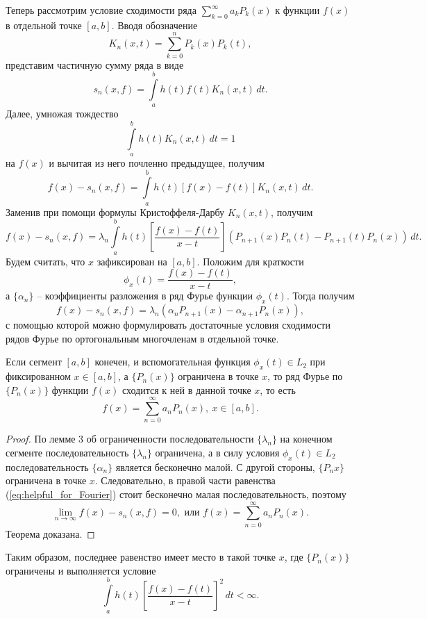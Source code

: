 Теперь рассмотрим условие сходимости ряда \( \sum\limits_{k=0}^\infty a_kP_k(x)
\) к функции \( f(x) \)  в отдельной точке \( [a,b] \). Вводя обозначение
\[
    K_n(x,t) = \sum\limits_{k=0}^n P_k(x)P_k(t),
\]
представим частичную сумму ряда в виде
\[
    s_n(x,f) = \int\limits_a^b h(t)f(t)K_n(x,t)\,dt.
\]
Далее, умножая тождество
\[
    \int\limits_a^b h(t)K_n(x,t)\,dt = 1
\]
на \( f(x) \) и вычитая из него почленно предыдущее, получим
\[
    f(x) - s_n(x,f) = \int\limits_a^b h(t)[f(x)-f(t)]K_n(x,t)\,dt.
\]
Заменив при помощи формулы Кристоффеля-Дарбу \( K_n(x,t) \), получим
\[
    f(x) - s_n(x,f) = \lambda_n\int\limits_a^b h(t)
    \left[\frac{f(x)-f(t)}{x-t}\right](P_{n+1}(x)P_n(t)-P_{n+1}(t)P_n(x))\,dt.
\]
Будем считать, что \( x \) зафиксирован на \( [a,b] \). Положим для краткости
\[
    \phi_x(t) = \frac{f(x)-f(t)}{x-t},
\]
а \( \{ \alpha_n \} \) -- коэффициенты разложения в ряд Фурье функции
\( \phi_x(t) \). Тогда получим 
\begin{equation}
    f(x) - s_n(x,f) = \lambda_n(\alpha_nP_{n+1}(x) - \alpha_{n+1}P_n(x)),
    \label{eq:helpful_for_Fourier}
\end{equation}
с помощью которой можно формулировать достаточные условия сходимости рядов Фурье
по ортогональным многочленам в отдельной точке.
\begin{theorem}
    Если сегмент \( [a,b] \) конечен, и вспомогательная функция
    \( \phi_x(t)\in L_2 \) при фиксированном \( x\in[a,b] \), а \( \{P_n(x)\} \)
    ограничена в точке \( x \), то ряд Фурье по \( \{P_n(x)\} \) функции
    \( f(x) \) сходится к ней в данной точке \( x \), то есть
    \[
        f(x) = \sum\limits_{n=0}^\infty a_nP_n(x),\ x\in[a,b].
    \]
\end{theorem}
\begin{proof}
    По лемме 3 об ограниченности последовательности \( \{\lambda_n\} \) на
    конечном сегменте последовательность \( \{\lambda_n\} \) ограничена, а в
    силу условия \( \phi_x(t)\in L_2 \) последовательность \( \{\alpha_n\} \)
    является бесконечно малой. С другой стороны, \( \{P_n{x}\} \) ограничена в
    точке \( x \). Следовательно, в правой части равенства
    (\ref{eq:helpful_for_Fourier}) стоит бесконечно малая последовательность,
    поэтому
    \[
        \lim_{n\rightarrow\infty} f(x) - s_n(x,f) = 0,\text{ или }
        f(x) = \sum_{n=0}^\infty a_nP_n(x).
    \]
    Теорема доказана.
\end{proof}

Таким образом, последнее равенство имеет место в такой точке \( x \), где 
\( \{ P_n(x) \} \) ограничены и выполняется условие
\begin{equation}
    \int\limits_a^b h(t)\left[\frac{f(x)-f(t)}{x-t}\right]^2\,dt < \infty.
    \label{eq:convergence_Fourier_in_L_2}
\end{equation}

